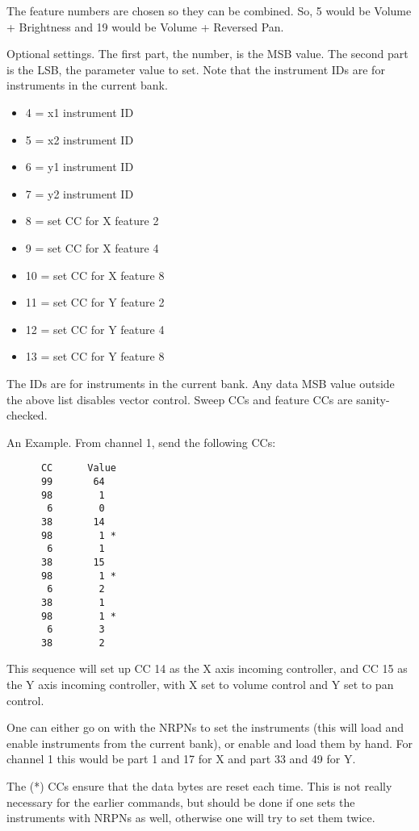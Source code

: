    The feature numbers are chosen so they can be combined. So, 5 would be
   Volume + Brightness and 19 would be Volume + Reversed Pan.

   Optional settings.  The first part, the number, is the MSB value.
   The second part is the LSB, the parameter value to set.  Note that the
   instrument IDs are for instruments in the current bank.

   \begin{itemize}
      \item 4 = x1 instrument ID
      \item 5 = x2 instrument ID
      \item 6 = y1 instrument ID
      \item 7 = y2 instrument ID
      \item 8 = set CC for X feature 2
      \item 9 = set CC for X feature 4
      \item 10 = set CC for X feature 8
      \item 11 = set CC for Y feature 2
      \item 12 = set CC for Y feature 4
      \item 13 = set CC for Y feature 8
   \end{itemize}

   The IDs are for instruments in the current bank.
   Any data MSB value outside the above list disables vector control.
   Sweep CCs and feature CCs are sanity-checked.

   An Example. From channel 1, send the following CCs:

   \begin{verbatim}
      CC      Value
      99       64
      98        1
       6        0
      38       14
      98        1 *
       6        1
      38       15
      98        1 *
       6        2
      38        1
      98        1 *
       6        3
      38        2
   \end{verbatim}

   This sequence will set up CC 14 as the X axis incoming controller,
   and CC 15 as the Y axis incoming controller, with X set to volume control
   and Y set to pan control.

   One can either go on with the NRPNs to set the instruments (this will load
   and enable instruments from the current bank), or enable and load
   them by hand.  For channel 1 this would be part 1 and 17 for X and part 33
   and 49 for Y.

   The (*) CCs ensure that the data bytes are reset each time. This is not
   really necessary for the earlier commands, but should be done if one sets
   the instruments with NRPNs as well, otherwise one will try to set them
   twice.

